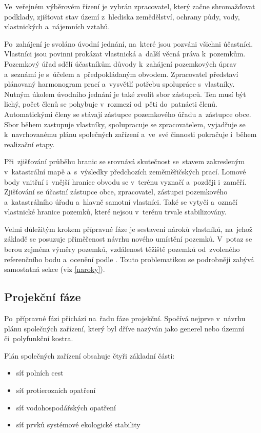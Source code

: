Ve~veřejném výběrovém řízení je vybrán zpracovatel, který začne
shromažďovat podklady, zjišťovat stav území z~hlediska zemědělství,
ochrany půdy, vody, vlastnických a~nájemních vztahů.

Po~zahájení  je svoláno úvodní jednání, na~které jsou pozváni
všichni účastníci. Vlastníci jsou povinni prokázat vlastnická a~další
věcná práva k~pozemkům. Pozemkový úřad sdělí účastníkům důvody
k~zahájení pozemkových úprav a~seznámí je s~účelem a~předpokládaným
obvodem. Zpracovatel představí plánovaný harmonogram prací a~vysvětlí
potřebu spolupráce s~vlastníky. Nutným úkolem úvodního jednání je také
zvolit sbor zástupců. Ten musí být lichý, počet členů se pohybuje
v~rozmezí od~pěti do~patnácti členů. Automatickými členy se stávají
zástupce pozemkového úřadu a~zástupce obce. Sbor během 
zastupuje vlastníky, spolupracuje se zpracovatelem, vyjadřuje se
k~navrhovanému plánu společných zařízení a~ve~své činnosti pokračuje
i~během realizační etapy.

Při~zjišťování průběhu hranic se srovnává skutečnost se~stavem
zakresleným v~katastrální mapě a~s~výsledky předchozích zeměměřičských
prací. Lomové body vnitřní i~vnější hranice obvodu se v~terénu vyznačí
a~později i~zaměří. Zjišťování se účastní zástupce obce, zpracovatel,
zástupci pozemkového a~katastrálního úřadu a~hlavně samotní
vlastníci. Také se vytyčí a~označí vlastnické hranice pozemků, které
nejsou v~terénu trvale stabilizovány.

Velmi důležitým krokem přípravné fáze je sestavení nároků vlastníků,
na~jehož základě se posuzuje přiměřenost návrhu nového umístění
pozemků. V~potaz se berou zejména výměry pozemků, vzdálenost těžiště
pozemků od~zvoleného referenčního bodu a~ocenění podle
. Touto problematikou se podrobněji zabývá samostatná sekce
(viz \ref{naroky}).

\subsection{Projekční fáze}
\label{projekcni_faze}

Po~přípravné fázi přichází na~řadu fáze projekční. Spočívá nejprve
v~návrhu plánu společných zařízení, který byl dříve nazýván jako
generel nebo územní či~polyfunkční kostra.

Plán společných zařízení obsahuje čtyři základní části:
\vspace{-\topsep}
	\begin{itemize}[leftmargin=1.5cm, noitemsep]
		\item síť polních cest
		\item síť protierozních opatření
		\item síť vodohospodářských opatření
		\item síť prvků systémové ekologické stability
	\end{itemize}

